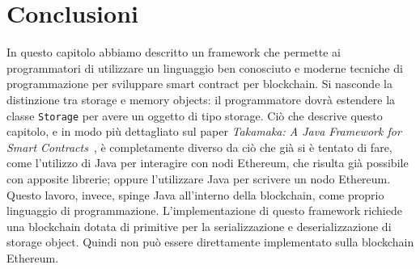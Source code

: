 \section{Conclusioni}
In questo capitolo abbiamo descritto un framework che permette ai programmatori di utilizzare un linguaggio ben conosciuto e moderne tecniche di programmazione per sviluppare smart contract per blockchain. Si nasconde la distinzione tra storage e memory objects: il programmatore dovrà estendere la classe \lstinline|Storage| per avere un oggetto di tipo storage. Ciò che descrive questo capitolo, e in modo più dettagliato sul paper \textit{Takamaka: A Java Framework for Smart Contracts}~\cite{paper-takamaka:spoto}, è completamente diverso da ciò che già si è tentato di fare, come l'utilizzo di Java per interagire con nodi Ethereum, che risulta già possibile con apposite librerie; oppure l'utilizzare Java per scrivere un nodo Ethereum. Questo lavoro, invece, spinge Java all'interno della blockchain, come proprio linguaggio di programmazione. L'implementazione di questo framework richiede una blockchain dotata di primitive per la serializzazione e deserializzazione di storage object. Quindi non può essere direttamente implementato sulla blockchain Ethereum.